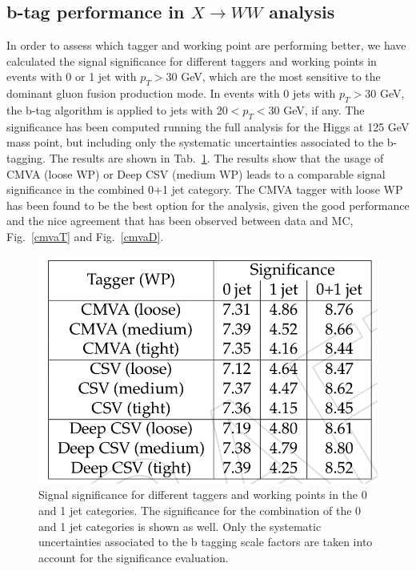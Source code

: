 \subsection*{b-tag performance in $X \to WW$ analysis}
In order to assess which tagger and working point are performing better, we have calculated
the signal significance for different taggers and working points in events with 0 or 1 jet with $p_T>$30  GeV, 
which are the most sensitive to the dominant gluon fusion production mode. In events with 0 jets with $p_T>$30  GeV, the b-tag algorithm is applied to jets with 20$< p_T <$30 GeV, if any. The significance
has been computed running the full analysis for the Higgs at 125 GeV mass point,  but including only the systematic uncertainties
associated to the b-tagging. The results are shown in Tab.~\ref{btt}.
The results show that the usage of CMVA (loose WP) or Deep CSV (medium WP) leads to a
comparable signal significance in the combined 0+1 jet category. The CMVA tagger with loose
WP has been found to be the best option for the analysis, given the good performance and the
nice agreement that has been observed between data and MC, Fig.~\ref{cmvaT} and  Fig.~\ref{cmvaD}.
\begin{figure}
\centering
\includegraphics[scale= 0.3]{../Cap4/btt}
\caption{Signal significance for different taggers and working points in the 0 and 1 jet categories. The significance for the combination of the 0 and 1 jet categories is shown as well. Only
the systematic uncertainties associated to the b tagging scale factors are taken into account for
the significance evaluation.}
\label{btt}
\end{figure}

